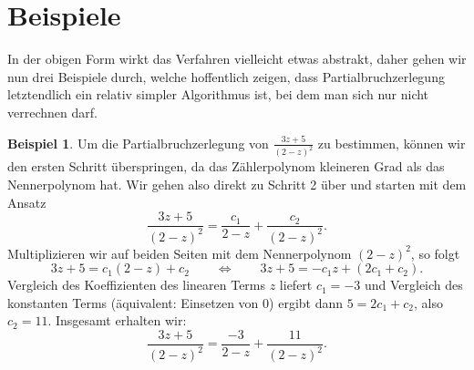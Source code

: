 \documentclass{article}
\theoremstyle{plain}
\theoremstyle{definition}
\newtheorem{example}{Beispiel}
\begin{document}
\section{Beispiele}
In der obigen Form wirkt das Verfahren vielleicht etwas abstrakt, daher gehen wir nun drei Beispiele durch, welche hoffentlich zeigen, dass Partialbruchzerlegung letztendlich ein relativ simpler Algorithmus ist, bei dem man sich nur nicht verrechnen darf.
\begin{example}
	Um die Partialbruchzerlegung von $\frac{3 z + 5}{(2 - z)^2}$ zu bestimmen, können wir den ersten Schritt überspringen, da das Zählerpolynom kleineren Grad als das Nennerpolynom hat.
	Wir gehen also direkt zu Schritt 2 über und starten mit dem Ansatz
	\[
		\frac{3 z + 5}{(2 - z)^2} = \frac{c_1}{2 - z} + \frac{c_2}{(2 - z)^2}.
	\]
	Multiplizieren wir auf beiden Seiten mit dem Nennerpolynom $(2 - z)^2$, so folgt
	\[
		3 z + 5 = c_1 (2 - z) + c_2 \qquad \iff \qquad 3 z + 5 = -c_1 z + (2 c_1 + c_2).
	\]
	Vergleich des Koeffizienten des linearen Terms $z$ liefert $c_1 = -3$ und Vergleich des konstanten Terms (äquivalent: Einsetzen von $0$) ergibt dann $5 = 2c_1 + c_2$, also $c_2 = 11$.
	Insgesamt erhalten wir:
	\[
		\frac{3 z + 5}{(2 - z)^2} = \frac{-3}{2 - z} + \frac{11}{(2 - z)^2}.
	\]
\end{example}
\end{document}
